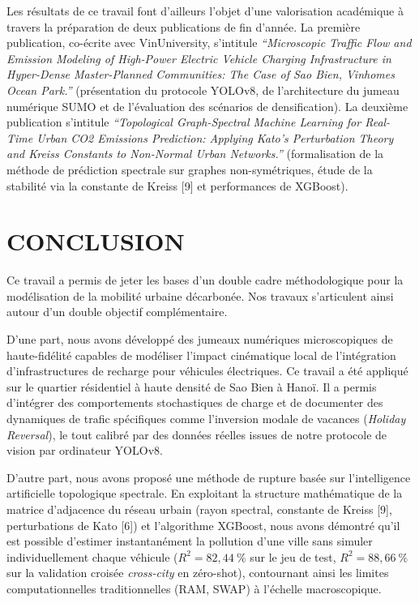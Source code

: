 \documentclass[10pt, a4paper]{article}
\begin{document}
Les résultats de ce travail font d'ailleurs l'objet d'une valorisation
académique à travers la préparation de deux publications de fin d'année.
La première publication, co-écrite avec VinUniversity, s'intitule
\emph{``Microscopic Traffic Flow and Emission Modeling of High-Power
Electric Vehicle Charging Infrastructure in Hyper-Dense Master-Planned
Communities: The Case of Sao Bien, Vinhomes Ocean Park.''} (présentation
du protocole YOLOv8, de l'architecture du jumeau numérique SUMO et de
l'évaluation des scénarios de densification). La deuxième publication
s'intitule \emph{``Topological Graph-Spectral Machine Learning for
Real-Time Urban CO2 Emissions Prediction: Applying Kato's Perturbation
Theory and Kreiss Constants to Non-Normal Urban Networks.''}
(formalisation de la méthode de prédiction spectrale sur graphes
non-symétriques, étude de la stabilité via la constante de Kreiss
{[}9{]} et performances de XGBoost).

\newpage

\section{CONCLUSION}\label{conclusion}

Ce travail a permis de jeter les bases d'un double cadre méthodologique
pour la modélisation de la mobilité urbaine décarbonée. Nos travaux
s'articulent ainsi autour d'un double objectif complémentaire.

D'une part, nous avons développé des jumeaux numériques microscopiques
de haute-fidélité capables de modéliser l'impact cinématique local de
l'intégration d'infrastructures de recharge pour véhicules électriques.
Ce travail a été appliqué sur le quartier résidentiel à haute densité de
Sao Bien à Hanoï. Il a permis d'intégrer des comportements stochastiques
de charge et de documenter des dynamiques de trafic spécifiques comme
l'inversion modale de vacances (\emph{Holiday Reversal}), le tout
calibré par des données réelles issues de notre protocole de vision par
ordinateur YOLOv8.

D'autre part, nous avons proposé une méthode de rupture basée sur
l'intelligence artificielle topologique spectrale. En exploitant la
structure mathématique de la matrice d'adjacence du réseau urbain (rayon
spectral, constante de Kreiss {[}9{]}, perturbations de Kato {[}6{]}) et
l'algorithme XGBoost, nous avons démontré qu'il est possible d'estimer
instantanément la pollution d'une ville sans simuler individuellement
chaque véhicule (\(R^2 = 82{,}44\ \%\) sur le jeu de test,
\(R^2 = 88{,}66\ \%\) sur la validation croisée \emph{cross-city} en
zéro-shot), contournant ainsi les limites computationnelles
traditionnelles (RAM, SWAP) à l'échelle macroscopique.
\end{document}
